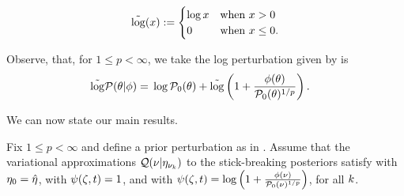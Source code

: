 \begin{defn}
%
\begin{align*}
%
\logtrim(x) :=
\begin{cases}
    \log x  &\textrm{when }x > 0 \\
    0       &\textrm{when }x \le 0.
\end{cases}
%
\end{align*}
%
%
%
\end{defn}

Observe, that, for $1 \le p < \infty$, we take the log perturbation given by
 is
%
\begin{align*}
%
\logtrim \p(\theta \vert \phi) ={}&
    \log \pbase(\theta) +
        \logtrim\left(1 + \frac{\phi(\theta)}{\pbase(\theta)^{1/p}} \right).
%
\end{align*}
%


We can now state our main results.


\begin{thm}
%
Fix $1 \le p < \infty$ and define a prior perturbation as in
.
Assume that the variational approximations $\mathcal{Q}(\nu \vert \eta_{\nu_{k}})$ to the
stick-breaking posteriors satisfy  with $\eta_0 =
\hat\eta$, with $\psi(\zeta, t) = 1$, and with $\psi(\zeta, t) = \log\left(1 + \frac{\phi(\nu)}{\mathcal{P}_{0}(\nu)^{1/p}} \right)$, for all $k$.

%
\end{thm}
